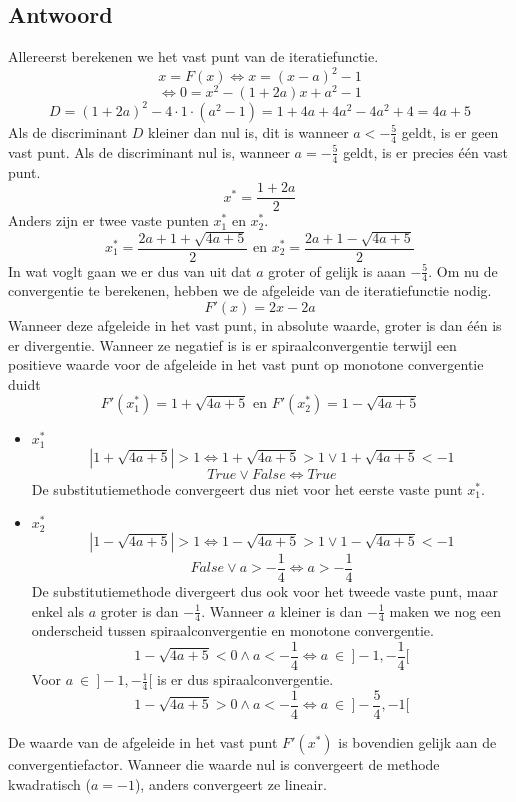 \documentclass[examenvragen.tex]{subfiles}
\begin{document}
\subsection{Antwoord}
Allereerst berekenen we het vast punt van de iteratiefunctie.
\[
x = F(x) \Leftrightarrow x = (x-a)^2-1
\]
\[
\Leftrightarrow 0 = x^2-(1+2a)x+a^2-1
\]
\[
D = (1+2a)^2 - 4\cdot1\cdot(a^2-1) = 1+4a+4a^2-4a^2+4 = 4a+5
\]
Als de discriminant $D$ kleiner dan nul is, dit is wanneer $a < - \frac{5}{4}$ geldt, is er geen vast punt. Als de discriminant nul is, wanneer $a=-\frac{5}{4}$ geldt, is er precies \'e\'en vast punt. 
\[
x^{*} = \frac{1+2a}{2}
\]
Anders zijn er twee vaste punten $x^{*}_{1}$ en $x^{*}_{2}$.
\[
x^{*}_1 = \frac{2a+1 +\sqrt{4a+5}}{2} \text{ en } x^{*}_{2}= \frac{2a+1 -\sqrt{4a+5}}{2}
\]
In wat voglt gaan we er dus van uit dat $a$ groter of gelijk is aaan $-\frac{5}{4}$.
Om nu de convergentie te berekenen, hebben we de afgeleide van de iteratiefunctie nodig.
\[
F'(x) = 2x-2a
\]
Wanneer deze afgeleide in het vast punt, in absolute waarde, groter is dan \'e\'en is er divergentie. Wanneer ze negatief is is er spiraalconvergentie terwijl een positieve waarde voor de afgeleide in het vast punt op monotone convergentie duidt
\[
F'(x^{*}_1) = 1 +  \sqrt{4a+5} \text{ en } F'(x^{*}_2) = 1-\sqrt{4a+5}
\]
\begin{itemize}
\item $x_{1}^{*}$
\[
|1 + \sqrt{4a+5}| > 1 \Leftrightarrow 1 + \sqrt{4a+5} > 1 \vee  1 + \sqrt{4a+5} < -1
\]
\[
True \vee False \Leftrightarrow True
\]
De substitutiemethode convergeert dus niet voor het eerste vaste punt $x_1^{*}$.
\item $x_{2}^{*}$
\[
|1-\sqrt{4a+5}| > 1 \Leftrightarrow  1-\sqrt{4a+5} > 1 \vee 1-\sqrt{4a+5} <-1
\]
\[
False \vee a > -\frac{1}{4} \Leftrightarrow a > -\frac{1}{4}
\]
De substitutiemethode divergeert dus ook voor het tweede vaste punt, maar enkel als $a$ groter is dan $-\frac{1}{4}$.
Wanneer $a$ kleiner is dan $-\frac{1}{4}$ maken we nog een onderscheid tussen spiraalconvergentie en monotone convergentie.
\[
1-\sqrt{4a+5} < 0 \wedge a < -\frac{1}{4} \Leftrightarrow a\ \in\  ]-1,-\frac{1}{4}[
\]
Voor $a\ \in\  ]-1,-\frac{1}{4}[$ is er dus spiraalconvergentie.
\[
1-\sqrt{4a+5} > 0 \wedge a < -\frac{1}{4} \Leftrightarrow a\ \in\ ]-\frac{5}{4},-1[
\]
\end{itemize}
De waarde van de afgeleide in het vast punt $F'(x^*)$ is bovendien gelijk aan de convergentiefactor. Wanneer die waarde nul is convergeert de methode kwadratisch ($a = -1$), anders convergeert ze lineair.
\end{document}
